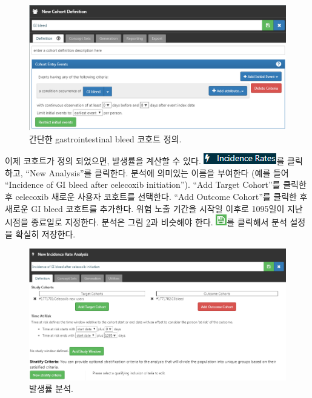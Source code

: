\documentclass[11pt]{book}
\theoremstyle{definition}
\theoremstyle{definition}
\theoremstyle{definition}
\theoremstyle{remark}
\begin{document}
\begin{figure}

{\centering \includegraphics[width=1\linewidth]{images/SuggestedAnswers/giBleedCohortDefinition} 

}

\caption{간단한 gastrointestinal bleed 코호트 정의.}\label{fig:giBleedCohortDefinition}
\end{figure}

이제 코호트가 정의 되었으면, 발생률을 계산할 수 있다.
\includegraphics{images/Characterization/atlasIncidenceMenuItem.png}를
클릭하고, ``New Analysis''를 클릭한다. 분석에 의미있는 이름을 부여한다
(예를 들어 ``Incidence of GI bleed after celecoxib initiation''). ``Add
Target Cohort''를 클릭한 후 celecoxib 새로운 사용자 코호트를 선택한다.
``Add Outcome Cohort''를 클릭한 후 새로운 GI bleed 코호트를 추가한다.
위험 노출 기간을 시작일 이후로 1095일이 지난 시점을 종료일로 지정한다.
분석은 그림 \ref{fig:irAnalysis}과 비슷해야 한다.
\includegraphics{images/Cohorts/save.png}를 클릭해서 분석 설정을 확실히
저장한다.

\begin{figure}

{\centering \includegraphics[width=1\linewidth]{images/SuggestedAnswers/irAnalysis} 

}

\caption{발생률 분석.}\label{fig:irAnalysis}
\end{figure}
\end{document}
